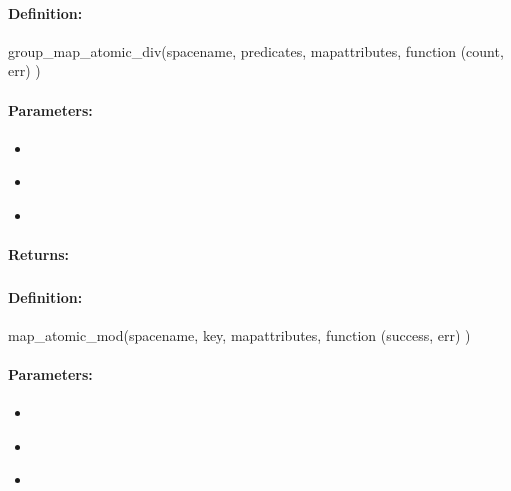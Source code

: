 \paragraph{Definition:}
\begin{javascriptcode}
group_map_atomic_div(spacename, predicates, mapattributes, function (count, err) {})
\end{javascriptcode}
\paragraph{Parameters:}
\begin{itemize}[noitemsep]
\item {}\\

\item {}\\

\item {}\\

\end{itemize}

\paragraph{Returns:}


\pagebreak
\subsubsection{}
\label{api:nodejs:map_atomic_mod}


\paragraph{Definition:}
\begin{javascriptcode}
map_atomic_mod(spacename, key, mapattributes, function (success, err) {})
\end{javascriptcode}
\paragraph{Parameters:}
\begin{itemize}[noitemsep]
\item {}\\

\item {}\\

\item {}\\

\end{itemize}

